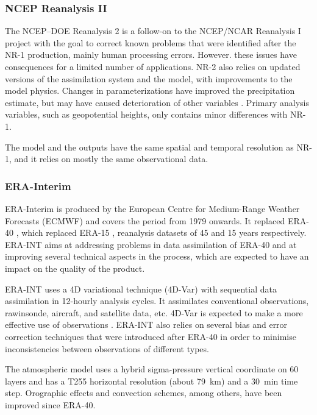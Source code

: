 \documentclass{ametsoc}
\begin{document}
\subsubsection{NCEP Reanalysis II}

The NCEP–DOE Reanalysis 2 \citep[NR-2,][]{Kanamitsu2002} is a follow-on to the NCEP/NCAR Reanalysis I project with the goal to correct known problems that were identified after the NR-1 production, mainly human processing errors. However. these issues have consequences for a limited number of applications. NR-2 also relies on updated versions of the assimilation system and the model, with improvements to the model physics. Changes in parameterizations have improved the precipitation estimate, but may have caused deterioration of other variables \citep{Kistler2001, Kanamitsu2002}. Primary analysis variables, such as geopotential heights, only contains minor differences with NR-1.

The model and the outputs have the same spatial and temporal resolution as NR-1, and it relies on mostly the same observational data.


\subsubsection{ERA-Interim}

ERA-Interim \citep[ERA-INT, ][]{Dee2011a} is produced by the European Centre for Medium-Range Weather Forecasts (ECMWF) and covers the period from 1979 onwards. It replaced ERA-40 \citep{Uppala2005}, which replaced ERA-15 \citep{Gibson1997}, reanalysis datasets of 45 and 15 years respectively. ERA-INT aims at addressing problems in data assimilation of ERA-40 and at improving several technical aspects in the process, which are expected to have an impact on the quality of the product.

ERA-INT uses a 4D variational technique (4D-Var) with sequential data assimilation in 12-hourly analysis cycles. It assimilates conventional observations, rawinsonde, aircraft, and satellite data, etc. 4D-Var is expected to make a more effective use of observations \citep{Dee2011a}. ERA-INT also relies on several bias and error correction techniques that were introduced after ERA-40 in order to minimise inconsistencies between observations of different types.

The atmospheric model uses a hybrid sigma-pressure vertical coordinate on 60 layers and has a T255 horizontal resolution (about 79~km) and a 30~min time step. Orographic effects and convection schemes, among others, have been improved since ERA-40.
\end{document}

